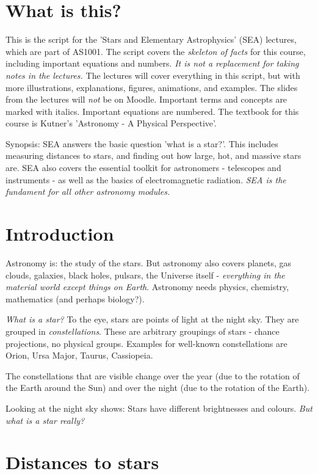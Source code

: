 \section{What is this?}

This is the script for the 'Stars and Elementary Astrophysics' (SEA) lectures, which are part of AS1001. The script covers the \textit{skeleton of facts} for this course, including important equations and numbers. \textit{It is not a replacement for taking notes in the lectures.} The lectures will cover everything in this script, but with more illustrations, explanations, figures, animations, and examples. The slides from the lectures will \textit{not} be on Moodle. Important terms and concepts are marked with italics. Important equations are numbered. The textbook for this course is Kutner's 'Astronomy - A Physical Perspective'. 

Synopsis: SEA answers the basic question 'what is a star?'. This includes measuring distances to stars, and finding out how large, hot, and massive stars are. SEA also covers the essential toolkit for astronomers - telescopes and instruments - as well as the basics of electromagnetic radiation. \textit{SEA is the fundament for all other astronomy modules.}

\section{Introduction}

Astronomy is: the study of the stars. But astronomy also covers planets, gas clouds, galaxies, black holes, pulsars, the Universe itself - \textit{everything in the material world except things on Earth}. Astronomy needs physics, chemistry, mathematics (and perhaps biology?).

\textit{What is a star?} To the eye, stars are points of light at the night sky. They are grouped in \textit{constellations}. These are arbitrary groupings of stars - chance projections, no physical groups. Examples for well-known constellations are Orion, Ursa Major, Taurus, Cassiopeia. 

The constellations that are visible change over the year (due to the rotation of the Earth around the Sun) and over the night (due to the rotation of the Earth). 

Looking at the night sky shows: Stars have different brightnesses and colours. \textit{But what is a star really?}

\section{Distances to stars}

